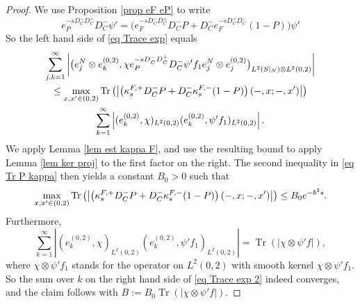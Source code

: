 \documentclass[11pt]{article}
\theoremstyle{plain}
\theoremstyle{definition}
\theoremstyle{remark}
\numberwithin{equation}{section}
\DeclareMathOperator{\Tr}{Tr}
\DeclareMathOperator{\supp}{supp}
\begin{document}
\begin{proof}
%
We use Proposition \ref{prop eF eP} to write
\[
e_P^{-s D_C^- D_C^+} D_C^- \psi' = \bigl( e_F^{-s D_C^- D_C^+} D_C^- P + D_C^- e_F^{-s D_C^+ D_C^-} (1-P)\bigr) \psi'
\]
So the left hand side of \eqref{eq Trace exp} equals
\begin{multline}\label{eq Trace exp 2}
\sum_{j,k=1}^{\infty} \left| \bigl( e_j^N \otimes e_k^{(0,2)},
\chi e_P^{-s D_C^- D_C^+} D_C^- \psi' f_1 e_j^N \otimes e_j^{(0,2)}
\bigr)_{L^2(S|_N) \otimes L^2(0,2)} \right| \\
\leq
\max_{x,x' \in (0,2)} \Tr\left(\left| \left(
\kappa_s^{F, +}D_C^-P + D_C^- \kappa_s^{F, -}(1-P)
\right)(\relbar, x; \relbar, x') \right| \right)\\
\sum_{k=1}^{\infty} \left| 
(e_k^{(0,2)},  \chi)_{L^2(0,2)} (e_k^{(0,2)}, \psi' f_1)_{L^2(0,2)}
\right|.
\end{multline}
%
%
%
%
We apply Lemma \ref{lem est kappa F}, and use the resulting bound
 to apply Lemma  \ref{lem ker proj} to the first factor on the right. The second inequality in \eqref{eq Tr P kappa}  then yields a constant $B_0>0$ such that
 \[
 \max_{x,x' \in (0,2)} \Tr\left(\left| \left(
\kappa_s^{F, +}D_C^-P + D_C^- \kappa_s^{F, -}(1-P)
\right)(\relbar, x; \relbar, x') \right| \right) \leq  B_0e^{-b^2 s}.
 \]
 Furthermore,
 \[
 \sum_{k=1}^{\infty} \left| 
(e_k^{(0,2)},  \chi)_{L^2(0,2)} (e_k^{(0,2)}, \psi' f_1)_{L^2(0,2)}\right| = \Tr(|\chi \otimes \psi' f|),
 \]
 where $\chi \otimes \psi' f_1$ stands for the operator on $L^2(0,2)$ with smooth kernel $\chi \otimes \psi' f_1$.
 So the sum over $k$ on the right hand side of \eqref{eq Trace exp 2} indeed converges, and the claim follows with $B:= B_0 \Tr(|\chi \otimes \psi' f|)$.
\end{proof}
\end{document}
